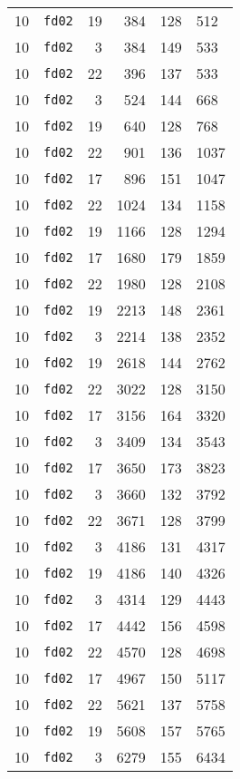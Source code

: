 \documentclass{article}
\begin{document}
\begin{table}[h!]
\begin{tabular}{llrrrl}
    10 & \texttt{fd02} & 19 & 384 & 128 & 512 \\
    10 & \texttt{fd02} & 3 & 384 & 149 & 533 \\
    10 & \texttt{fd02} & 22 & 396 & 137 & 533 \\
    10 & \texttt{fd02} & 3 & 524 & 144 & 668 \\
    10 & \texttt{fd02} & 19 & 640 & 128 & 768 \\
    10 & \texttt{fd02} & 22 & 901 & 136 & 1037 \\
    10 & \texttt{fd02} & 17 & 896 & 151 & 1047 \\
    10 & \texttt{fd02} & 22 & 1024 & 134 & 1158 \\
    10 & \texttt{fd02} & 19 & 1166 & 128 & 1294 \\
    10 & \texttt{fd02} & 17 & 1680 & 179 & 1859 \\
    10 & \texttt{fd02} & 22 & 1980 & 128 & 2108 \\
    10 & \texttt{fd02} & 19 & 2213 & 148 & 2361 \\
    10 & \texttt{fd02} & 3 & 2214 & 138 & 2352 \\
    10 & \texttt{fd02} & 19 & 2618 & 144 & 2762 \\
    10 & \texttt{fd02} & 22 & 3022 & 128 & 3150 \\
    10 & \texttt{fd02} & 17 & 3156 & 164 & 3320 \\
    10 & \texttt{fd02} & 3 & 3409 & 134 & 3543 \\
    10 & \texttt{fd02} & 17 & 3650 & 173 & 3823 \\
    10 & \texttt{fd02} & 3 & 3660 & 132 & 3792 \\
    10 & \texttt{fd02} & 22 & 3671 & 128 & 3799 \\
    10 & \texttt{fd02} & 3 & 4186 & 131 & 4317 \\
    10 & \texttt{fd02} & 19 & 4186 & 140 & 4326 \\
    10 & \texttt{fd02} & 3 & 4314 & 129 & 4443 \\
    10 & \texttt{fd02} & 17 & 4442 & 156 & 4598 \\
    10 & \texttt{fd02} & 22 & 4570 & 128 & 4698 \\
    10 & \texttt{fd02} & 17 & 4967 & 150 & 5117 \\
    10 & \texttt{fd02} & 22 & 5621 & 137 & 5758 \\
    10 & \texttt{fd02} & 19 & 5608 & 157 & 5765 \\
    10 & \texttt{fd02} & 3 & 6279 & 155 & 6434 \\

\end{tabular}
\end{table}
\end{document}
